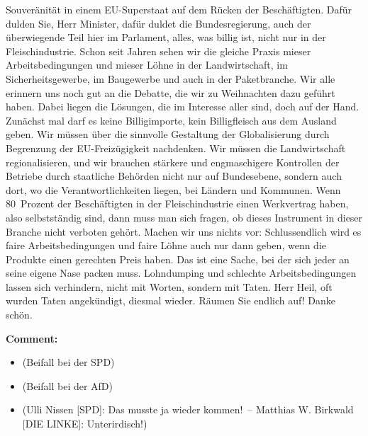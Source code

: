 \documentclass{article}
\begin{document}
Souveränität in einem EU-Superstaat auf dem Rücken der Beschäftigten. Dafür dulden Sie, Herr Minister, dafür duldet die Bundesregierung, auch der überwiegende Teil hier im Parlament, alles, was billig ist, nicht nur in der Fleischindustrie. Schon seit Jahren sehen wir die gleiche Praxis mieser Arbeitsbedingungen und mieser Löhne in der Landwirtschaft, im Sicherheitsgewerbe, im Baugewerbe und auch in der Paketbranche. Wir alle erinnern uns noch gut an die Debatte, die wir zu Weihnachten dazu geführt haben. Dabei liegen die Lösungen, die im Interesse aller sind, doch auf der Hand. Zunächst mal darf es keine Billigimporte, kein Billigfleisch aus dem Ausland geben.  Wir müssen über die sinnvolle Gestaltung der Globalisierung durch Begrenzung der EU-Freizügigkeit nachdenken. Wir müssen die Landwirtschaft regionalisieren, und wir brauchen stärkere und engmaschigere Kontrollen der Betriebe durch staatliche Behörden nicht nur auf Bundesebene, sondern auch dort, wo die Verantwortlichkeiten liegen, bei Ländern und Kommunen. Wenn 80 Prozent der Beschäftigten in der Fleischindustrie einen Werkvertrag haben, also selbstständig sind, dann muss man sich fragen, ob dieses Instrument in dieser Branche nicht verboten gehört. Machen wir uns nichts vor: Schlussendlich wird es faire Arbeitsbedingungen und faire Löhne auch nur dann geben, wenn die Produkte einen gerechten Preis haben. Das ist eine Sache, bei der sich jeder an seine eigene Nase packen muss. Lohndumping und schlechte Arbeitsbedingungen lassen sich verhindern, nicht mit Worten, sondern mit Taten. Herr Heil, oft wurden Taten angekündigt, diesmal wieder. Räumen Sie endlich auf! Danke schön.  

\noindent\textbf{Comment:}
\begin{itemize}
    \setlength\itemsep{-3pt}
    \item (Beifall bei der SPD)
    \setlength\itemsep{-3pt}
    \item (Beifall bei der AfD)
    \setlength\itemsep{-3pt}
    \item (Ulli Nissen [SPD]: Das musste ja wieder kommen! – Matthias W. Birkwald [DIE LINKE]: Unterirdisch!)
\end{itemize}
\end{document}
